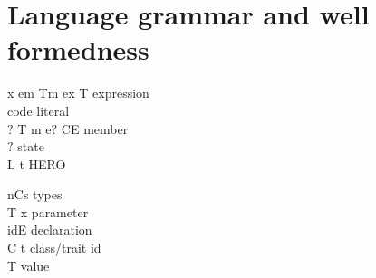 \section{Language grammar and well formedness}
\begin{minipage}{0.63\textwidth}
\begin{bnf}
      {x \mmid{} em \mmid{}Tm
\mmid{} ex \mmid{}  T
}{expression}\\      {
\mmid{} 
}        {code literal}\\      {$?$ T m e$?$ \mmid{} C\eq{}E }                                                    {member}\\      {$?$}                                          {state}\\      {L \mmid{} t \mmid{}  \mmid{} }           {HERO}%
\end{bnf}
\end{minipage}
\begin{minipage}[t]{0.5\textwidth}
\begin{bnf}
      {nCs}                                                 {types}\\     {T x}                                                              {parameter}\\      {id\eq{}E}                                                         {declaration}\\     {C \mmid{} t}                                                      {class/trait id}\\      { T}                                                 {value}%
\end{bnf}
\end{minipage}


